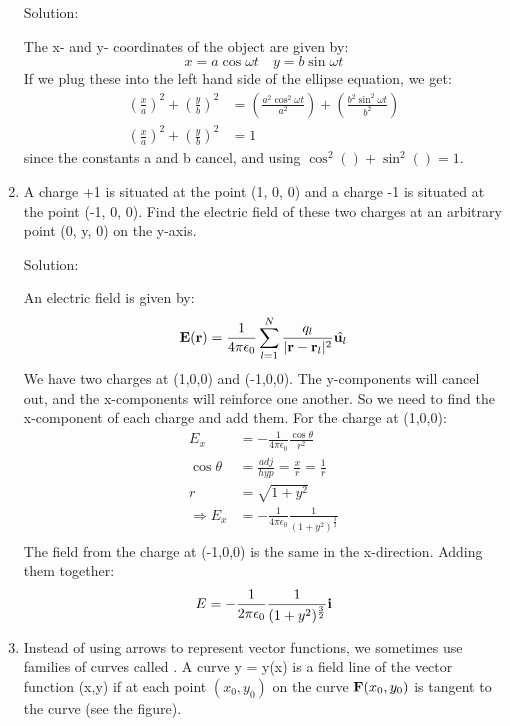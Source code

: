\documentclass{article}
\begin{document}
\begin{enumerate}
    Solution:

    The x- and y- coordinates of the object are given by:
    \[ x = a\cos{\omega t} \quad  y = b\sin{\omega t} \]
    If we plug these into the left hand side of the ellipse equation, we get:
    \begin{align*}
        {\left(\frac{x}{a}\right)}^2 + {\left(\frac{y}{b}\right)}^2 &= {\left(\frac{a^2\cos^2{\omega t}}{a^2} \right)} + {\left(\frac{b^2\sin^2{\omega t}}{b^2} \right)} \\
        {\left(\frac{x}{a}\right)}^2 + {\left(\frac{y}{b}\right)}^2 &= 1
    \end{align*}
    since the constants a and b cancel, and using $\cos^2() + \sin^2() = 1$.

    \item A charge +1 is situated at the point (1, 0, 0) and a charge -1 is
    situated at the point (-1, 0, 0). Find the electric field of these two charges
    at an arbitrary point (0, y, 0) on the y-axis.

    Solution:

    An electric field is given by:
    \[ \textbf{E}(\textbf{r}) = \frac{1}{4\pi\epsilon_0}\sum_{l=1}^{N}\frac{q_l}{|\textbf{r}-\textbf{r}_l|^2} \hat{\textbf{u}_l} \]
    We have two charges at (1,0,0) and (-1,0,0). The y-components will cancel out, and the
    x-components will reinforce one another. So we need to find the x-component of each
    charge and add them. For the charge at (1,0,0):
    \begin{align*}
        E_x &= -\frac{1}{4 \pi \epsilon_0} \frac{\cos{\theta}}{r^2} \\
        \cos{\theta} &= \frac{adj}{hyp} = \frac{x}{r} = \frac{1}{r} \\
        r &= \sqrt{1 + y^2} \\
        \Rightarrow E_x &= -\frac{1}{4 \pi \epsilon_0} \frac{1}{(1+y^2)^\frac{3}{2}} \\
    \end{align*}
    The field from the charge at (-1,0,0) is the same in the x-direction. Adding them together:
    \[ E = -\frac{1}{2 \pi \epsilon_0} \frac{1}{(1+y^2)^\frac{3}{2}} \textbf{i} \]

    \item Instead of using arrows to represent vector functions, we sometimes use families
    of curves called . A curve y = y(x) is a field line of the vector
    function (x,y) if at each point $(x_0, y_0)$ on the curve $\textbf{F}(x_0, y_0)$
    is tangent to the curve (see the figure). %


\end{enumerate}
\end{document}
